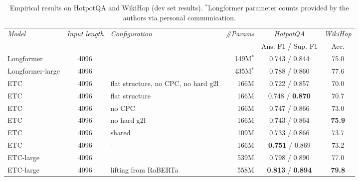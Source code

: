 \documentclass[11pt,a4paper]{article}
\begin{document}
\begin{table*}[tb]\centering 
\begin{small}
\begin{tabular}{lclr|cc} 
{\em Model} & {\em Input length} & {\em Configuration} & {\em \#Params} & {\em HotpotQA} & {\em WikiHop}\\ 
 &  &  & & Ans. F1 / Sup. F1 & Acc. \\ \hline
Longformer  & 4096  &  & 149M$^*$ & 0.743 / 0.844 &  75.0  \\ 
Longformer-large  & 4096  &  & 435M$^*$ &  0.788 / 0.860\footnotemark &  77.6  \\ \hline
ETC	        &   4096	& flat structure, no CPC, no hard g2l   & 166M & 0.722 / 0.857     & 70.0   \\
ETC	        &   4096	& flat structure                        & 166M & 0.748 / {\bf 0.870}     & 70.7     \\
ETC	        &   4096	& no CPC                                & 166M & 0.747 / 0.866     & 73.0    \\
ETC	        &   4096	& no hard g2l                           & 166M & 0.743 / 0.864     & {\bf 75.9}  \\
ETC	        &   4096	& shared                                & 109M & 0.733 / 0.866     & 73.7   \\
ETC	        &   4096    & -                                     & 166M & {\bf 0.751} / 0.869	  & 73.2     \\ \hline
ETC-large	&   4096    &                                      & 539M & 0.798 / 0.890	    & 77.0    \\
ETC-large	&   4096    & lifting from RoBERTa                  & 558M & {\bf 0.813} / {\bf 0.894}	    & {\bf 79.8}    \\
\end{tabular}		
\end{small}
\caption{Empirical results on HotpotQA and WikiHop (dev set results). $^*$Longformer parameter counts provided by the authors via personal communication.}
\label{tbl:results-hop} 
\end{table*}
\end{document}
